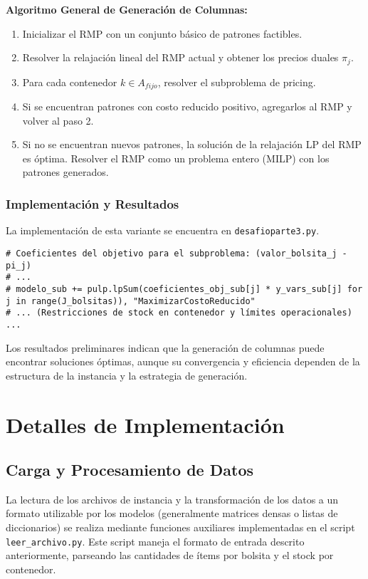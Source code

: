 \documentclass[a4paper,12pt]{article}
\begin{document}
\textbf{Algoritmo General de Generación de Columnas:}
\begin{enumerate}
    \item Inicializar el RMP con un conjunto básico de patrones factibles.
    \item Resolver la relajación lineal del RMP actual y obtener los precios duales $\pi_j$.
    \item Para cada contenedor $k \in A_{fijo}$, resolver el subproblema de pricing.    \item Si se encuentran patrones con costo reducido positivo, agregarlos al RMP y volver al paso 2.
    \item Si no se encuentran nuevos patrones, la solución de la relajación LP del RMP es óptima. Resolver el RMP como un problema entero (MILP) con los patrones generados.
\end{enumerate}

\subsubsection{Implementación y Resultados}
La implementación de esta variante se encuentra en \texttt{desafioparte3.py}.
\begin{lstlisting}[caption={Extracto de desafioparte3.py (Subproblema)}, label={lst:desafio3_subproblema}]
# Coeficientes del objetivo para el subproblema: (valor_bolsita_j - pi_j)
# ...
# modelo_sub += pulp.lpSum(coeficientes_obj_sub[j] * y_vars_sub[j] for j in range(J_bolsitas)), "MaximizarCostoReducido"
# ... (Restricciones de stock en contenedor y límites operacionales) ...
\end{lstlisting}
Los resultados preliminares indican que la generación de columnas puede encontrar soluciones óptimas, aunque su convergencia y eficiencia dependen de la estructura de la instancia y la estrategia de generación.

\section{Detalles de Implementación}

\subsection{Carga y Procesamiento de Datos}
La lectura de los archivos de instancia y la transformación de los datos a un formato utilizable por los modelos (generalmente matrices densas o listas de diccionarios) se realiza mediante funciones auxiliares implementadas en el script \texttt{leer\_archivo.py}. Este script maneja el formato de entrada descrito anteriormente, parseando las cantidades de ítems por bolsita y el stock por contenedor.
\end{document}
